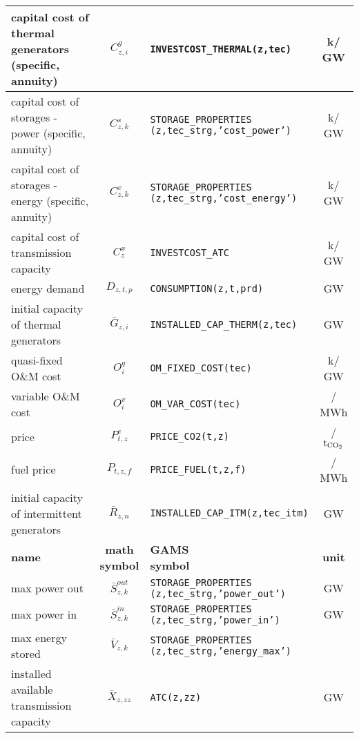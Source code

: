 \documentclass[11pt,a4paper]{article}
\begin{document}
\begin{longtable}{p{4.1cm} c l c}
	capital cost of thermal generators (specific, annuity) & $C^{g}_{z,i}$ & \texttt{INVESTCOST\_THERMAL(z,tec)} & k\EUR / GW \\ \hline
	capital cost of storages - power (specific, annuity) & $C^{s}_{z,k}$ & \makecell[l]{\texttt{STORAGE\_PROPERTIES} \\ \texttt{(z,tec\_strg,'cost\_power')}} & k\EUR / GW \\ \hline
	capital cost of storages - energy (specific, annuity) & $C^{v}_{z,k}$ & \makecell[l]{\texttt{STORAGE\_PROPERTIES} \\ \texttt{(z,tec\_strg,'cost\_energy')}} & k\EUR / GW \\ \hline
	capital cost of transmission capacity & $C^{x}_{z}$ & \texttt{INVESTCOST\_ATC} & k\EUR / GW \\ \hline
	energy demand & $D_{z,t,p}$ & \texttt{CONSUMPTION(z,t,prd)} & GW \\ \hline
	initial capacity of thermal generators & $\bar{G}_{z,i}$ & \texttt{INSTALLED\_CAP\_THERM(z,tec)} & GW \\ \hline
	quasi-fixed O\&M cost & $O^{q}_{i}$ & \texttt{OM\_FIXED\_COST(tec)} & k\EUR / GW \\ \hline
	variable O\&M cost & $O^{v}_{i}$ & \texttt{OM\_VAR\_COST(tec)} & \EUR / MWh \\ \hline
	\ce{CO2} price & $P^{e}_{t,z}$ & \texttt{PRICE\_CO2(t,z)} & \EUR / $\text{t}_{\ce{CO2}}$ \\ \hline
	fuel price & $P_{t,z,f}$ & \texttt{PRICE\_FUEL(t,z,f)} & \EUR / MWh \\ \hline
	initial capacity of intermittent generators & $\bar{R}_{z,n}$ & \texttt{INSTALLED\_CAP\_ITM(z,tec\_itm)} & GW \\ \hline
\pagebreak
\hline
	\textbf{name} & \makecell[l]{\textbf{math} \\ \textbf{symbol}} & \makecell[l]{\textbf{GAMS} \\\textbf{symbol}} & \textbf{unit} \\ \hline \hline
	max power out & $\bar{S}^{out}_{z,k}$ & \makecell[l]{\texttt{STORAGE\_PROPERTIES} \\ \texttt{(z,tec\_strg,'power\_out')}} & GW \\ \hline
	max power in & $\bar{S}^{in}_{z,k}$ & \makecell[l]{\texttt{STORAGE\_PROPERTIES} \\ \texttt{(z,tec\_strg,'power\_in')}} & GW \\ \hline
	max energy stored & $\bar{V}_{z,k}$ & \makecell[l]{\texttt{STORAGE\_PROPERTIES} \\ \texttt{(z,tec\_strg,'energy\_max')}} &  \\ \hline
	installed available transmission capacity & $\bar{X}_{z,zz}$ & \texttt{ATC(z,zz)} & GW \\ \hline \hline	
\end{longtable}
\end{document}
